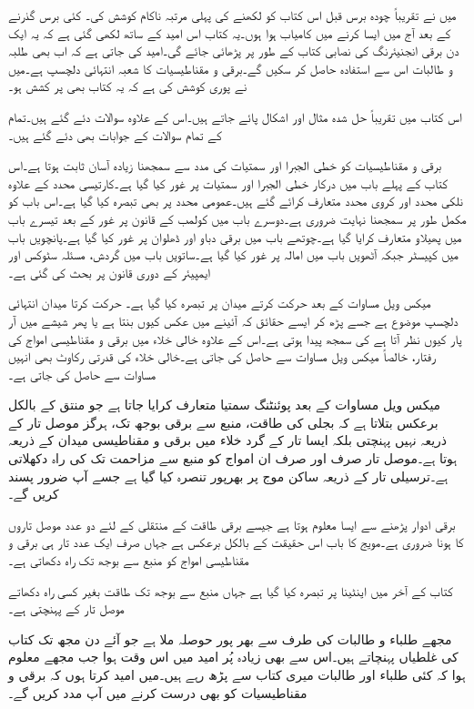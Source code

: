 میں نے تقریباً چودہ برس قبل اس کتاب کو لکھنے کی پہلی مرتبہ ناکام کوشش کی۔ کئی برس گذرنے کے بعد آج میں ایسا کرنے میں کامیاب ہوا ہوں۔یہ کتاب اس امید کے ساتھ لکھی گئی ہے کہ یہ ایک دن برقی انجنیئرنگ کی نصابی کتاب کے طور پر پڑھائی جائے گی۔امید کی جاتی ہے کہ اب بھی طلبہ و طالبات اس سے استفادہ حاصل کر سکیں گے۔برقی و مقناطیسیات کا شعبہ انتہائی دلچسپ ہے۔میں نے پوری کوشش کی ہے کہ یہ کتاب بھی پر کشش ہو۔

اس کتاب میں تقریباً  حل شدہ مثال اور  اشکال پائے جاتے ہیں۔اس کے علاوہ  سوالات دئے گئے ہیں۔تمام کے تمام سوالات کے جوابات بھی دئے گئے ہیں۔

برقی و مقناطیسیات کو خطی الجبرا اور سمتیات کی مدد سے سمجھنا زیادہ آسان ثابت ہوتا ہے۔اس کتاب کے پہلے باب میں درکار خطی الجبرا اور سمتیات پر غور کیا گیا ہے۔کارتیسی محدد کے علاوہ نلکی محدد اور کروی محدد متعارف کرائے گئے ہیں۔عمومی محدد پر بھی تبصرہ کیا گیا ہے۔اس باب کو مکمل طور پر سمجھنا نہایت ضروری ہے۔دوسرے باب میں کولمب کے قانون پر غور کے بعد تیسرے باب میں پھیلاو متعارف کرایا گیا ہے۔چوتھے باب میں برقی دباو اور ڈھلوان پر غور کیا گیا ہے۔پانچویں باب میں کپیسٹر جبکہ آٹھویں باب میں امالہ پر غور کیا گیا ہے۔ساتویں باب میں گردش، مسئلہ سٹوکس اور ایمپیئر کے دوری قانون پر بحث کی گئی ہے۔ 

میکس ویل مساوات کے بعد حرکت کرتے میدان پر تبصرہ کیا گیا ہے۔ حرکت کرتا میدان انتہائی دلچسپ موضوع ہے جسے پڑھ کر ایسے حقائق کہ  آئینے میں عکس کیوں بنتا ہے یا پھر شیشے میں آر پار کیوں نظر آتا ہے کی سمجھ پیدا ہوتی ہے۔اس کے علاوہ خالی خلاء میں برقی و مقناطیسی امواج کی رفتار، خالصاً میکس ویل مساوات سے حاصل کی جاتی ہے۔خالی خلاء کی قدرتی رکاوٹ بھی انہیں مساوات سے حاصل کی جاتی ہے۔

میکس ویل مساوات کے بعد پوئنٹنگ سمتیا متعارف کرایا جاتا ہے جو منتق کے بالکل برعکس بتلاتا ہے کہ بجلی کی طاقت، منبع سے برقی بوجھ تک، ہرگز موصل تار کے ذریعہ نہیں پہنچتی بلکہ ایسا تار کے گرد خلاء میں برقی و مقناطیسی میدان کے ذریعہ ہوتا ہے۔موصل تار صرف اور صرف ان امواج کو منبع سے مزاحمت تک کی راہ دکھلاتی ہے۔ترسیلی تار کے ذریعہ ساکن موج پر بھرپور تنصرہ کیا گیا ہے جسے آپ ضرور پسند کریں گے۔

برقی ادوار پڑھنے سے ایسا معلوم ہوتا ہے جیسے برقی طاقت کے منتقلی کے لئے دو عدد موصل تاروں کا ہونا ضروری ہے۔مویج کا باب اس حقیقت کے بالکل برعکس ہے جہاں صرف ایک عدد تار  ہی برقی و مقناطیسی امواج کو منبع سے بوجھ تک راہ دکھاتی ہے۔

کتاب کے آخر میں اینٹینا پر تبصرہ کیا گیا ہے جہاں منبع سے بوجھ تک طاقت بغیر کسی راہ دکھاتے موصل تار کے پہنچتی ہے۔

مجھے طلباء و طالبات کی طرف سے بھر پور حوصلہ ملا ہے جو آئے دن مجھ تک کتاب کی غلطیاں پہنچاتے ہیں۔اس سے بھی زیادہ پُر امید میں اس وقت ہوا جب مجھے معلوم ہوا کہ کئی طلباء اور طالبات میری کتاب سے پڑھ رہے ہیں۔میں امید کرتا ہوں کہ برقی و مقناطیسیات کو بھی درست کرنے میں آپ مدد کریں گے۔

